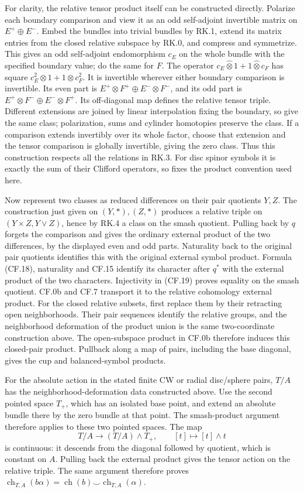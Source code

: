 \documentclass[
  11pt,
]{article}
\begin{document}
For clarity, the relative tensor product itself can be constructed
directly. Polarize each boundary comparison and view it as an odd
self-adjoint invertible matrix on \(E^+\oplus E^-\). Embed the bundles
into trivial bundles by RK.1, extend its matrix entries from the closed
relative subspace by RK.0, and compress and symmetrize. This gives an
odd self-adjoint endomorphism \(c_E\) on the whole bundle with the
specified boundary value; do the same for \(F\). The operator
\(c_E\widehat\otimes1+1\widehat\otimes c_F\) has square
\(c_E^2\otimes1+1\otimes c_F^2\). It is invertible wherever either
boundary comparison is invertible. Its even part is
\(E^+\otimes F^+\oplus E^-\otimes F^-\), and its odd part is
\(E^+\otimes F^-\oplus E^-\otimes F^+\). Its off-diagonal map defines
the relative tensor triple. Different extensions are joined by linear
interpolation fixing the boundary, so give the same class; polarization,
sums and cylinder homotopies preserve the class. If a comparison extends
invertibly over its whole factor, choose that extension and the tensor
comparison is globally invertible, giving the zero class. Thus this
construction respects all the relations in RK.3. For disc spinor symbols
it is exactly the sum of their Clifford operators, so fixes the product
convention used here.

Now represent two classes as reduced differences on their pair quotients
\(Y,Z\). The construction just given on \((Y,*),(Z,*)\) produces a
relative triple on \((Y\times Z,Y\vee Z)\), hence by RK.4 a class on the
smash quotient. Pulling back by \(q\) forgets the comparison and gives
the ordinary external product of the two differences, by the displayed
even and odd parts. Naturality back to the original pair quotients
identifies this with the original external symbol product. Formula
(CF.18), naturality and CF.15 identify its character after \(q^*\) with
the external product of the two characters. Injectivity in (CF.19)
proves equality on the smash quotient. CF.0b and CF.7 transport it to
the relative cohomology external product. For the closed relative
subsets, first replace them by their retracting open neighborhoods.
Their pair sequences identify the relative groups, and the neighborhood
deformation of the product union is the same two-coordinate construction
above. The open-subspace product in CF.0b therefore induces this
closed-pair product. Pullback along a map of pairs, including the base
diagonal, gives the cup and balanced-symbol products.

For the absolute action in the stated finite CW or radial disc/sphere
pairs, \(T/A\) has the neighborhood-deformation data constructed above.
Use the second pointed space \(T_+\), which has an isolated base point,
and extend an absolute bundle there by the zero bundle at that point.
The smash-product argument therefore applies to these two pointed
spaces. The map \[
T/A\longrightarrow (T/A)\wedge T_+,\qquad [t]\longmapsto[t]\wedge t
\] is continuous: it descends from the diagonal followed by quotient,
which is constant on \(A\). Pulling back the external product gives the
tensor action on the relative triple. The same argument therefore proves
\(\operatorname{ch}_{T,A}(b\alpha)=\operatorname{ch}(b)\smile\operatorname{ch}_{T,A}(\alpha)\).
\end{document}
